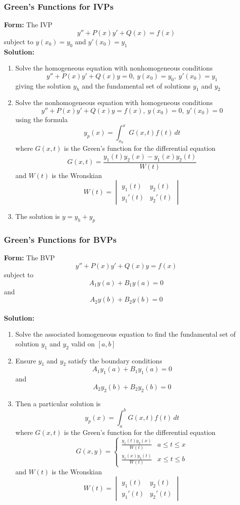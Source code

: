 \documentclass{article}
\begin{document}
\subsubsection{Green's Functions for IVPs}

\textbf{Form:} The IVP \[y'' + P(x) y' + Q(x) = f(x)\] subject to $y(x_0) = y_0$ and $y'(x_0) = y_1$ \\ \textbf{Solution:} \begin{enumerate}
  \item Solve the homogeneous equation with nonhomogeneous conditions \[y'' + P(x) y' + Q(x) y = 0, \: y(x_0) = y_0, \: y'(x_0) = y_1\] giving the solution $y_h$ and the fundamental set of solutions $y_1$ and $y_2$

  \item Solve the nonhomogeneous equation with homogeneous conditions \[y'' + P(x) y' + Q(x) y = f(x), \: y(x_0) = 0, \: y'(x_0) = 0\] using the formula \[y_p(x) = \int_{x_0}^x G(x, t) f(t) \,dt\] where $G(x, t)$ is the Green's function for the differential equation \[G(x, t) = \frac{y_1(t) y_2(x) - y_1(x) y_2(t)}{W(t)}\] and $W(t)$ is the Wronskian \[W(t) = \begin{vmatrix}
            y_1(t)  & y_2(t)  \\
            y_1'(t) & y_2'(t)
          \end{vmatrix}\]

  \item The solution is $y = y_h + y_p$
\end{enumerate}

\subsubsection{Green's Functions for BVPs}

\textbf{Form:} The BVP \[y'' + P(x) y' + Q(x) y = f(x)\] subject to \[A_1 y(a) + B_1 y(a) = 0\] and \[A_2 y(b) + B_2 y(b) = 0\] \\ \textbf{Solution:} \begin{enumerate}
  \item Solve the associated homogeneous equation to find the fundamental set of solution $y_1$ and $y_2$ valid on $[a, b]$

  \item Ensure $y_1$ and $y_2$ satisfy the boundary conditions \[A_1 y_1(a) + B_1 y_1(a) = 0\] and \[A_2 y_2(b) + B_2 y_2(b) = 0\]

  \item Then a particular solution is \[y_p(x) = \int_a^b G(x, t) f(t) \,dt\] where $G(x, t)$ is the Green's function for the differential equation \[G(x, y) = \begin{cases}
            \frac{y_1(t) y_2(x)}{W(t)} & a \le t \le x \\
            \frac{y_1(x) y_2(t)}{W(t)} & x \le t \le b
          \end{cases}\] and $W(t)$ is the Wronskian \[W(t) = \begin{vmatrix}
            y_1(t)  & y_2(t)  \\
            y_1'(t) & y_2'(t)
          \end{vmatrix}\]
\end{enumerate}
\end{document}
